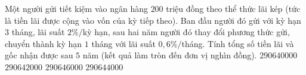 \begin{ex}%
	Một người gửi tiết kiệm vào ngân hàng $200$ triệu đồng theo thể thức lãi kép (tức là tiền lãi được cộng vào vốn của kỳ tiếp theo). Ban đầu người đó gửi với kỳ hạn $3$ tháng, lãi suất $2\%/$kỳ hạn, sau hai năm người đó thay đổi phương thức gửi, chuyển thành kỳ hạn $1$ tháng với lãi suất $0{,}6\%/$tháng. Tính tổng số tiền lãi và gốc nhận được sau $5$ năm (kết quả làm tròn đến đơn vị nghìn đồng).
	\choice
	{$290640000$}
	{\True $290642000$}
	{$290646000$}
	{$290644000$}
\end{ex}
